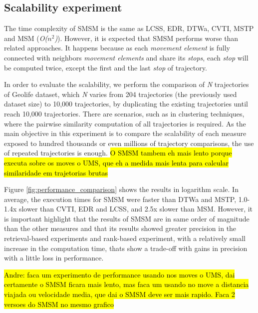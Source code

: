 \documentclass[12pt]{article}
\begin{document}
\subsection{Scalability experiment}
The time complexity of SMSM is the same as LCSS, EDR, DTWa, CVTI, MSTP and MSM (\emph{O($n^2$)}). However, it is expected that SMSM performs worse than related approaches. It happens because as each \emph{movement element} is fully connected with neighbors \emph{movement elements} and share its \emph{stops}, each \emph{stop} will be computed twice, except the first and the last \emph{stop} of trajectory.

In order to evaluate the scalability, we perform the comparison of \emph{N} trajectories of Geolife dataset, which \emph{N} varies from 204 trajectories (the previously used dataset size) to 10,000 trajectories, by duplicating the existing trajectories until reach 10,000 trajectories. There are scenarios, such as in clustering techniques, where the pairwise similarity computation of all trajectories is required. As the main objective in this experiment is to compare the scalability of each measure exposed to hundred thousands or even millions of trajectory comparisons, the use of repeated trajectories is enough. \hl{O SMSM tambem eh mais lento porque executa sobre os moves o UMS, que eh a medida mais lenta para calcular similaridade em trajetorias brutas}

Figure \ref{fig:performance_comparison} shows the results in logarithm scale. In average, the execution times for SMSM were faster than DTWa and MSTP, 1.0-1.4x slower than CVTI,  EDR and LCSS, and 2.5x slower than MSM. However, it is important highlight that the results of SMSM are in same order of magnitude than the other measures and that its results showed greater precision in the retrieval-based experiments and rank-based experiment, with a relatively small increase in the computation time, thats show a trade-off with gains in precision with a little loss in performance.

\hl{Andre: faca um experimento de performance usando nos moves o UMS, dai certamente o SMSM ficara mais lento, mas faca um usando no move a distancia viajada ou velocidade media, que dai o SMSM deve ser mais rapido. Faca 2 versoes do SMSM no mesmo grafico}
\end{document}
